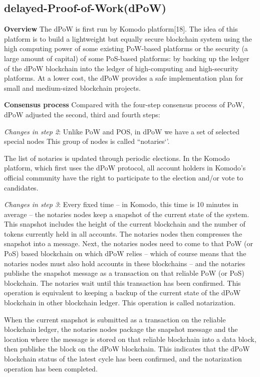 \documentclass[doublespacing]{bmcart}
\begin{document}
\begin{CJK*}{UTF8}{gbsn}
    \subsection{\textbf{delayed-Proof-of-Work(dPoW)}}
    \textbf{Overview}	
	 The dPoW is first run by Komodo platform[18]. The idea of this platform is to build a lightweight but equally secure blockchain system using the high computing power of some existing PoW-based platforms or the security (a large amount of capital) of some PoS-based platforms: by backing up the ledger of the dPoW blockchain into the ledger of high-computing and high-security platforms. At a lower cost, the dPoW provides a safe implementation plan for small and medium-sized blockchain projects.
    \par \textbf{Consensus process}
    Compared with the four-step consensus process of PoW, dPoW adjusted the second, third and fourth steps:
    \par\textsl{Changes in step 2}: Unlike PoW and POS, in dPoW we have a set of selected special nodes This group of nodes is called ``notaries‘’.
	\par The list of notaries is updated through periodic elections. In the Komodo platform, which first uses the dPoW protocol, all account holders in Komodo's official community have the right to participate to the election and/or vote to candidates.
    \par\textsl{Changes in step 3}: Every fixed time -- in Komodo, this time is 10 minutes in average -- the notaries nodes keep a snapshot of the current state of the system. This snapshot includes the height of the current blockchain and the number of tokens currently held in all accounts. The notaries nodes then compresses the snapshot into a message. Next, the notaries nodes need to come to that PoW (or PoS) based blockchain on which dPoW relies -- which of course means that the notaries nodes must also hold accounts in these blockchains -- and the notaries publishe the snapshot message as a transaction on that reliable PoW (or PoS) blockchain. The notaries wait until this transaction has been confirmed. This operation is equivalent to keeping a backup of the current state of the dPoW blockchain in other blockchain ledger. This operation is called notarization.

When the current snapshot is submitted as a transaction on the reliable blockchain ledger, the notaries nodes package the snapshot message and the location where the message is stored on that reliable blockchain into a data block, then publishe the block on the dPoW blockchain. This indicates that the dPoW blockchain status of the latest cycle has been confirmed, and the notarization operation has been completed.


\end{CJK*}
\end{document}
